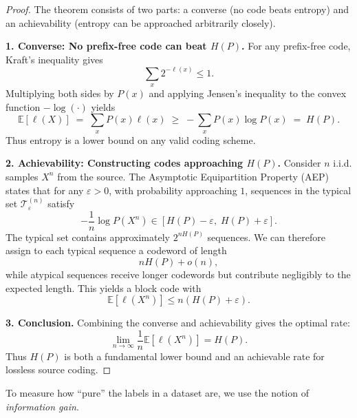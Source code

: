 \documentclass[../main]{subfiles}
\begin{document}
\begin{proof}
    The theorem consists of two parts: a converse (no code beats entropy) and
    an achievability (entropy can be approached arbitrarily closely).
    
    \textbf{1. Converse: No prefix-free code can beat $H(P)$.}
    For any prefix-free code, Kraft's inequality gives
    \begin{equation}
        \sum_x 2^{-\ell(x)} \le 1.
    \end{equation}
    Multiplying both sides by $P(x)$ and applying Jensen's inequality to the
    convex function $-\log(\cdot)$ yields
    \begin{equation}
        \mathbb{E}[\ell(X)]
        \;=\; \sum_x P(x)\ell(x)
        \;\ge\; -\sum_x P(x)\log P(x)
        \;=\; H(P).
    \end{equation}
    Thus entropy is a lower bound on any valid coding scheme.
    
    \textbf{2. Achievability: Constructing codes approaching $H(P)$.}
    Consider $n$ i.i.d. samples $X^n$ from the source.  
    The Asymptotic Equipartition Property (AEP) states that for any
    $\varepsilon>0$, with probability approaching $1$, sequences in the
    typical set $\mathcal{T}_\varepsilon^{(n)}$ satisfy
    \begin{equation}
        -\frac{1}{n}\log P(X^n)
        \in [H(P)-\varepsilon,\; H(P)+\varepsilon].
    \end{equation}
    The typical set contains approximately $2^{nH(P)}$ sequences.
    We can therefore assign to each typical sequence a codeword of length
    \[
        nH(P)+o(n),
    \]
    while atypical sequences receive longer codewords but contribute
    negligibly to the expected length.  
    This yields a block code with
    \begin{equation}
        \mathbb{E}[\ell(X^n)]
        \le n(H(P)+\varepsilon).
    \end{equation}
    
    \textbf{3. Conclusion.}
    Combining the converse and achievability gives the optimal rate:
    \[
        \lim_{n\to\infty} \frac{1}{n}\mathbb{E}[\ell(X^n)] = H(P).
    \]
    Thus $H(P)$ is both a fundamental lower bound and an achievable rate for
    lossless source coding.
    \end{proof}

        To measure how ``pure'' the labels in a dataset are, we use the notion of
        \emph{information gain}.
        
\end{document}
